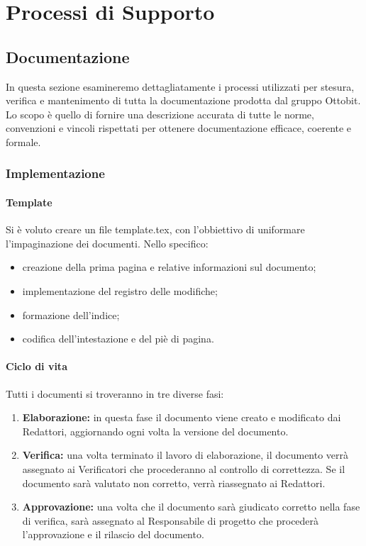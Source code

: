 \documentclass[11pt,a4paper]{article}
\begin{document}
{	
	
	\newpage
	\section{Processi di Supporto}
	
	\subsection{Documentazione}
	In questa sezione esamineremo dettagliatamente i processi utilizzati per stesura, verifica e mantenimento di tutta la documentazione prodotta dal gruppo Ottobit.
	Lo scopo è quello di fornire una descrizione accurata di tutte le norme, convenzioni e vincoli rispettati per ottenere documentazione efficace, coerente e formale.
	\subsubsection{Implementazione}
	
	\paragraph{Template\\}
	Si è voluto creare un file template.tex, con l'obbiettivo di uniformare l'impaginazione dei documenti. 
	Nello specifico:
	\begin{itemize}
		\item{creazione della prima pagina e relative informazioni sul documento;}
		\item{implementazione del registro delle modifiche;}
		\item{formazione dell'indice;}
		\item {codifica dell'intestazione e del piè di pagina.}
		
	\end{itemize}
	
	\paragraph{Ciclo di vita\\}
	Tutti i documenti si troveranno in tre diverse fasi:
	\begin{enumerate}
		\item \textbf{Elaborazione:} in questa fase il documento viene creato e modificato dai Redattori, aggiornando ogni volta la versione del documento. 
		\item \textbf{Verifica:} una volta terminato il lavoro di elaborazione, il documento verrà assegnato ai Verificatori che procederanno al controllo di correttezza. Se il documento sarà valutato non corretto, verrà riassegnato ai Redattori.
		\item \textbf{Approvazione:} una volta che il documento sarà giudicato corretto nella fase di verifica, sarà assegnato al Responsabile di progetto che procederà l'approvazione e il rilascio del documento.
	\end{enumerate}
	
}
\end{document}
